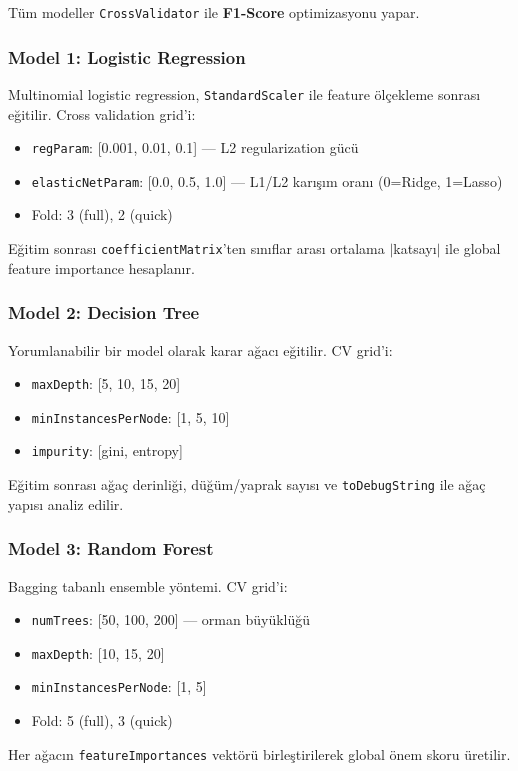\documentclass[12pt,a4paper]{article}
\begin{document}
Tüm modeller \texttt{CrossValidator} ile \textbf{F1-Score} optimizasyonu yapar.

\subsubsection{Model 1: Logistic Regression}
Multinomial logistic regression, \texttt{StandardScaler} ile feature ölçekleme sonrası eğitilir. Cross validation grid'i:
\begin{itemize}[noitemsep]
  \item \texttt{regParam}: [0.001, 0.01, 0.1] — L2 regularization gücü
  \item \texttt{elasticNetParam}: [0.0, 0.5, 1.0] — L1/L2 karışım oranı (0=Ridge, 1=Lasso)
  \item Fold: 3 (full), 2 (quick)
\end{itemize}
Eğitim sonrası \texttt{coefficientMatrix}'ten sınıflar arası ortalama $|$katsayı$|$ ile global feature importance hesaplanır.

\subsubsection{Model 2: Decision Tree}
Yorumlanabilir bir model olarak karar ağacı eğitilir. CV grid'i:
\begin{itemize}[noitemsep]
  \item \texttt{maxDepth}: [5, 10, 15, 20]
  \item \texttt{minInstancesPerNode}: [1, 5, 10]
  \item \texttt{impurity}: [gini, entropy]
\end{itemize}
Eğitim sonrası ağaç derinliği, düğüm/yaprak sayısı ve \texttt{toDebugString} ile ağaç yapısı analiz edilir.

\subsubsection{Model 3: Random Forest}
Bagging tabanlı ensemble yöntemi. CV grid'i:
\begin{itemize}[noitemsep]
  \item \texttt{numTrees}: [50, 100, 200] — orman büyüklüğü
  \item \texttt{maxDepth}: [10, 15, 20]
  \item \texttt{minInstancesPerNode}: [1, 5]
  \item Fold: 5 (full), 3 (quick)
\end{itemize}
Her ağacın \texttt{featureImportances} vektörü birleştirilerek global önem skoru üretilir.
\end{document}
